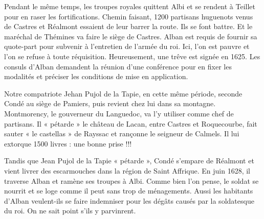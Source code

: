 Pendant le même temps, les troupes royales quittent Albi et se rendent
à Teillet pour en raser les fortifications. Chemin faisant, 1200
partisans huguenots venus de Castres et Réalmont essaient de leur
barrer la route. Ils se font battre. Et le maréchal de Thémines va
faire le siège de Castres. Alban est requis de fournir sa quote-part
pour subvenir à l'entretien de l'armée du roi. Ici, l'on est pauvre
et l'on se refuse à toute réquisition. Heureusement, une trêve est
signée en 1625. Les consuls d'Alban demandent la réunion d'une
conférence pour en fixer les modalités et préciser les conditions
de mise en application.

Notre compatriote Jehan Pujol de la Tapie, en cette même période,
seconde Condé au siège de Pamiers, puis revient chez lui dans sa
montagne. Montmorency, le gouverneur du Languedoc, va l'y utiliser
comme chef de partisans. Il « pétarde » le château de Lacan, entre
Castres et Roquecourbe, fait sauter « le castellas » de Rayssac et
rançonne le seigneur de Calmels. Il lui extorque 1500 livres :
une bonne prise !!!

Tandis que Jean Pujol de la Tapie « pétarde », Condé s'empare de
Réalmont et vient livrer des escarmouches dans la région de Saint
Affrique. En juin 1628, il traverse Alban et ramène ses troupes à
Albi. Comme bien l'on pense, le soldat se nourrit et se loge comme
il peut sans trop de ménagements. Aussi les habitants d'Alban
veulent-ils se faire indemniser pour les dégâts causés par la
soldatesque du roi. On ne sait point s'ils y parvinrent.